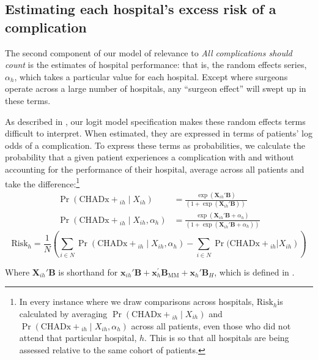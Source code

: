\documentclass[submission]{grattan}
\newcommand*{\myTitle}{All complications should count}
\begin{document}
\subsection{Estimating each hospital's excess risk of a complication}\label{subsec:estimating-each-hospitals-excess-risk-of-a-complication}

The second component of our model of relevance to \textit{\myTitle} is the estimates of hospital performance: that is, the random effects series, \(\alpha_{h}\), which takes a particular value for each hospital.
Except where surgeons operate across a large number of hospitals, any ``surgeon effect'' will swept up in these terms.

As described in , our logit model specification makes these random effects terms difficult to interpret.
When estimated, they are expressed in terms of patients' log odds of a complication.
To express these terms as probabilities, we calculate the probability that a given patient experiences a complication with and without accounting for the performance of their hospital, average across all patients and take the difference:\footnote{In every instance where we draw comparisons across hospitals, \(\text{Risk}_{h}\)is calculated by averaging \(\Pr(\mathrm{CHADx+}_{{ih}}\mid X_{{ih}})\) and \(\Pr(\mathrm{CHADx+}_{ih}\mid X_{ih},\alpha_{h})\) across all patients, even those who did not attend that particular hospital, \(h\).
This is so that all hospitals are being assessed relative to the same cohort of patients.}
\begin{align*}
\Pr(\mathrm{CHADx+}_{ih} \mid X_{ih})            &= \frac{\exp\left(\mathbf{X}_{ih}'\mathbf{B} \right)}{\left(1 + \exp\left( \mathbf{X}_{ih}'\mathbf{B} \right) \right)\ }\\
\Pr(\mathrm{CHADx+}_{ih}\mid X_{ih}, \alpha_{h}) &= \frac{\exp\left(\mathbf{X}_{ih}'\mathbf{B} +\alpha_{h} \right)}{\left( 1 + \exp\left( \mathbf{X}_{ih}'\mathbf{B} + \alpha_{h} \right) \right)}
\end{align*}
\[
\text{Risk}_{h}                                  = \frac{1}{N}\left(\sum_{i \in N}{\Pr(\mathrm{CHADx+}_{{ih}} \mid X_{ih},\alpha_{h})} - \sum_{i \in N} \Pr(\mathrm{CHADx+}_{ih}\left| X_{{ih}} \right)\right)
\]

Where \(\mathbf{X}_{{ih}}'\mathbf{B}\) is shorthand for \(\mathbf{x}_{{ih}}'\mathbf{B} + \mathbf{x}_{h}^{'}\mathbf{B}_{\text{MM}} + \mathbf{x}_{h}'\mathbf{B}_{H}\), which is defined in .
\end{document}
